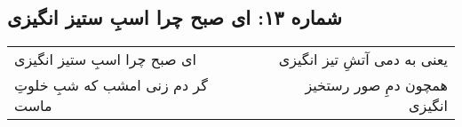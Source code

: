 \begin{center}
\section*{شماره ۱۳: ای صبح چرا اسبِ ستیز انگیزی}
\label{sec:013}
\begin{longtable}{l p{0.5cm} r}
ای صبح چرا اسبِ ستیز انگیزی
&&
یعنی به دمی آتشِ تیز انگیزی
\\
گر دم زنی امشب که شبِ خلوتِ ماست
&&
همچون دمِ صور رستخیز انگیزی
\\
\end{longtable}
\end{center}
